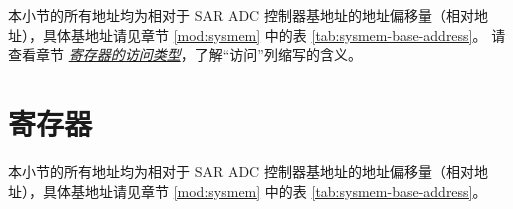 \documentclass[main\_\_CN.tex]{subfiles}
\begin{document}
本小节的所有地址均为相对于 SAR ADC 控制器基地址的地址偏移量（相对地址），具体基地址请见章节 \ref{mod:sysmem} \textit{} 中的表 \ref{tab:sysmem-base-address}。
请查看章节 \hyperref[glossary-access-types]{\textit{寄存器的访问类型}}，了解“访问”列缩写的含义。






\newpage
\section{寄存器}

本小节的所有地址均为相对于 SAR ADC 控制器基地址的地址偏移量（相对地址），具体基地址请见章节 \ref{mod:sysmem} \textit{} 中的表 \ref{tab:sysmem-base-address}。


\end{document}
